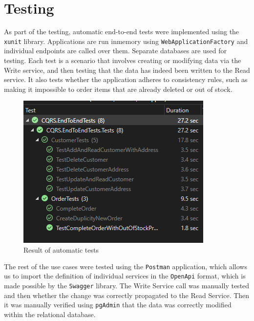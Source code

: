 \documentclass[12pt,english]{article}
\begin{document}
\section{Testing}
As part of the testing, automatic end-to-end tests were implemented using the \texttt{xunit} library. Applications are run inmemory using \texttt{WebApplicationFactory} and individual endpoints are called over them. Separate databases are used for testing. Each test is a scenario that involves creating or modifying data via the Write service, and then testing that the data has indeed been written to the Read service. It also tests whether the application adheres to consistency rules, such as making it impossible to order items that are already deleted or out of stock. 

\begin{figure}[tbhp]
    \centering
    \includegraphics[scale=1.2]{images/automaticTests.PNG}
    \caption{Result of automatic tests}
\end{figure}
\newpage
The rest of the use cases were tested using the \texttt{Postman} application, which allows us to import the definition of individual services in the \texttt{OpenApi} format, which is made possible by the \texttt{Swagger} library. The Write Service call was manually tested and then whether the change was correctly propagated to the Read Service. Then it was manually verified using \texttt{pgAdmin} that the data was correctly modified within the relational database.
\end{document}
